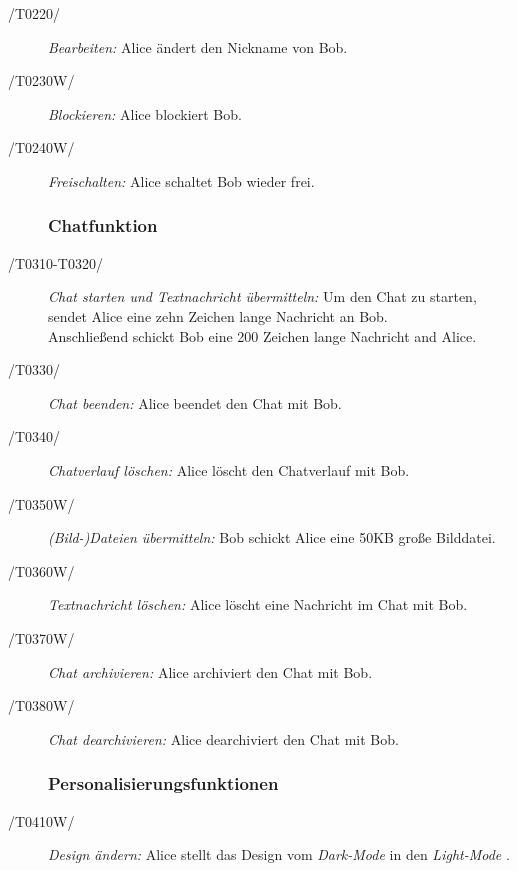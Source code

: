 \begin{description}
		\item[/T0220/]
			\textit{Bearbeiten:}
				\textnormal{Alice ändert den Nickname von Bob.}
				
		\item[/T0230W/]
			\textit{Blockieren:}
				\textnormal{Alice blockiert Bob. }
				
				\item[/T0240W/]
			\textit{Freischalten:}
				\textnormal{Alice schaltet Bob wieder frei. }

\subsubsection{Chatfunktion}

		\item[/T0310-T0320/]
			\textit{Chat starten und Textnachricht übermitteln:}
				\textnormal{Um den Chat zu starten, sendet Alice eine zehn Zeichen lange Nachricht an Bob. \\ Anschließend schickt Bob eine 200 Zeichen lange Nachricht and Alice. }
				
		
		\item[/T0330/]
			\textit{Chat beenden:}
			\textnormal{Alice beendet den Chat mit Bob.}		
			
					\item[/T0340/]
			\textit{Chatverlauf löschen:}
			\textnormal{Alice löscht den Chatverlauf mit Bob.}			
			
		\item[/T0350W/]
			\textit{(Bild-)Dateien übermitteln:}
			\textnormal{Bob schickt Alice eine 50KB große Bilddatei.} 
			
		\item[/T0360W/]
			\textit{Textnachricht löschen:}
			\textnormal{Alice löscht eine Nachricht im Chat mit Bob.} 
			
				\item[/T0370W/]
			\textit{Chat archivieren:}
			\textnormal{Alice archiviert den Chat mit Bob.} 
			
						\item[/T0380W/]
			\textit{Chat dearchivieren:}
			\textnormal{Alice dearchiviert den Chat mit Bob.} 
			
			
		\subsubsection{Personalisierungsfunktionen}
		
		\item[/T0410W/]
			\textit{Design ändern:}
			\textnormal{Alice stellt das Design vom \textit{Dark-Mode} in den \textit{Light-Mode} .} 
			

\end{description}
